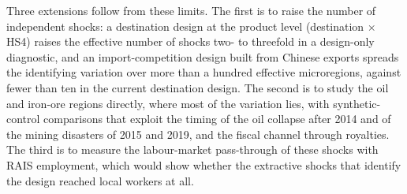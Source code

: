 \documentclass[
	11pt,				%
	oneside,			%
	a4paper,			%
	english,			%
	english				%
	]{abntex2ppgsi}
\theoremstyle{plain}
\theoremstyle{remark}
\theoremstyle{plain}%
\theoremstyle{remark}%
\begin{document}
Three extensions follow from these limits. The first is to raise the number of independent shocks: a destination design at the product level (destination $\times$ HS4) raises the effective number of shocks two- to threefold in a design-only diagnostic, and an import-competition design built from Chinese exports spreads the identifying variation over more than a hundred effective microregions, against fewer than ten in the current destination design. The second is to study the oil and iron-ore regions directly, where most of the variation lies, with synthetic-control comparisons that exploit the timing of the oil collapse after 2014 and of the mining disasters of 2015 and 2019, and the fiscal channel through royalties. The third is to measure the labour-market pass-through of these shocks with RAIS employment, which would show whether the extractive shocks that identify the design reached local workers at all.

\postextual



\end{document}
